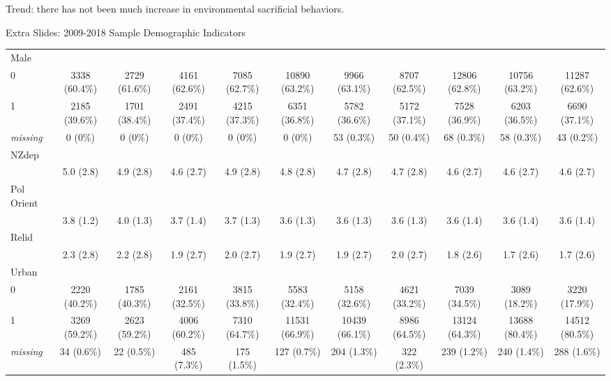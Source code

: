 \documentclass{beamer}
\begin{document}
\begin{frame}{Trend: there has not been much increase in environmental sacrificial behaviors.}
\begin{frame}{Extra Slides: 2009-2018 Sample Demographic Indicators}
\begin{table}
{\begin{tabular}{ l c c c c c c c c c c }
Male &   &   &   &   &   &   &   &   &   &  \\ 
\hspace{6pt}    0 & 3338 (60.4\%) & 2729 (61.6\%) & 4161 (62.6\%) & 7085 (62.7\%) & 10890 (63.2\%) & 9966 (63.1\%) & 8707 (62.5\%) & 12806 (62.8\%) & 10756 (63.2\%) & 11287 (62.6\%)\\ 
\hspace{6pt}    1 & 2185 (39.6\%) & 1701 (38.4\%) & 2491 (37.4\%) & 4215 (37.3\%) & 6351 (36.8\%) & 5782 (36.6\%) & 5172 (37.1\%) & 7528 (36.9\%) & 6203 (36.5\%) & 6690 (37.1\%)\\ 
\hspace{6pt}    \emph{missing} & 0 (0\%) & 0 (0\%) & 0 (0\%) & 0 (0\%) & 0 (0\%) & 53 (0.3\%) & 50 (0.4\%) & 68 (0.3\%) & 58 (0.3\%) & 43 (0.2\%)\\ 
NZdep &   &   &   &   &   &   &   &   &   &  \\ 
\hspace{6pt}   & 5.0 (2.8) & 4.9 (2.8) & 4.6 (2.7) & 4.9 (2.8) & 4.8 (2.8) & 4.7 (2.8) & 4.7 (2.8) & 4.6 (2.7) & 4.6 (2.7) & 4.6 (2.7)\\ 
Pol Orient &   &   &   &   &   &   &   &   &   &  \\ 
\hspace{6pt}   & 3.8 (1.2) & 4.0 (1.3) & 3.7 (1.4) & 3.7 (1.3) & 3.6 (1.3) & 3.6 (1.3) & 3.6 (1.3) & 3.6 (1.4) & 3.6 (1.4) & 3.6 (1.4)\\ 
Relid &   &   &   &   &   &   &   &   &   &  \\ 
\hspace{6pt}   & 2.3 (2.8) & 2.2 (2.8) & 1.9 (2.7) & 2.0 (2.7) & 1.9 (2.7) & 1.9 (2.7) & 2.0 (2.7) & 1.8 (2.6) & 1.7 (2.6) & 1.7 (2.6)\\ 
Urban &   &   &   &   &   &   &   &   &   &  \\ 
\hspace{6pt}    0 & 2220 (40.2\%) & 1785 (40.3\%) & 2161 (32.5\%) & 3815 (33.8\%) & 5583 (32.4\%) & 5158 (32.6\%) & 4621 (33.2\%) & 7039 (34.5\%) & 3089 (18.2\%) & 3220 (17.9\%)\\ 
\hspace{6pt}    1 & 3269 (59.2\%) & 2623 (59.2\%) & 4006 (60.2\%) & 7310 (64.7\%) & 11531 (66.9\%) & 10439 (66.1\%) & 8986 (64.5\%) & 13124 (64.3\%) & 13688 (80.4\%) & 14512 (80.5\%)\\ 
\hspace{6pt}    \emph{missing} & 34 (0.6\%) & 22 (0.5\%) & 485 (7.3\%) & 175 (1.5\%) & 127 (0.7\%) & 204 (1.3\%) & 322 (2.3\%) & 239 (1.2\%) & 240 (1.4\%) & 288 (1.6\%)\\ 
\bottomrule


\end{tabular}}
\end{table}
\end{frame}
\end{frame}
\end{document}
